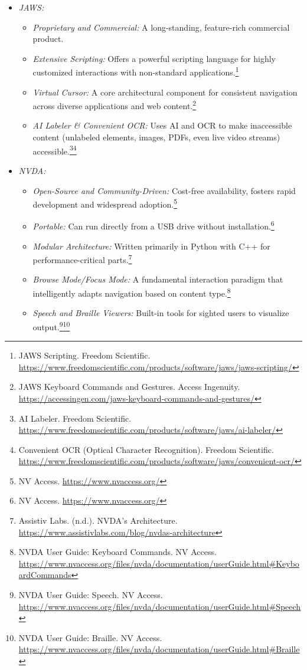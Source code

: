 \begin{itemize}
    \item \emph{JAWS:}
    \begin{itemize}
        \item \emph{Proprietary and Commercial:} A long-standing, feature-rich commercial product.
        \item \emph{Extensive Scripting:} Offers a powerful scripting language for highly customized interactions with non-standard applications.\footnote{JAWS Scripting. Freedom Scientific. \url{https://www.freedomscientific.com/products/software/jaws/jaws-scripting/}}
        \item \emph{Virtual Cursor:} A core architectural component for consistent navigation across diverse applications and web content.\footnote{JAWS Keyboard Commands and Gestures. Access Ingenuity. \url{https://accessingen.com/jaws-keyboard-commands-and-gestures/}}
        \item \emph{AI Labeler \& Convenient OCR:} Uses AI and OCR to make inaccessible content (unlabeled elements, images, PDFs, even live video streams) accessible.\footnote{AI Labeler. Freedom Scientific. \url{https://www.freedomscientific.com/products/software/jaws/ai-labeler/}}\footnote{Convenient OCR (Optical Character Recognition). Freedom Scientific. \url{https://www.freedomscientific.com/products/software/jaws/convenient-ocr/}}
    \end{itemize}
    \item \emph{NVDA:}
    \begin{itemize}
        \item \emph{Open-Source and Community-Driven:} Cost-free availability, fosters rapid development and widespread adoption.\footnote{NV Access. \url{https://www.nvaccess.org/}}
        \item \emph{Portable:} Can run directly from a USB drive without installation.\footnote{NV Access. \url{https://www.nvaccess.org/}}
        \item \emph{Modular Architecture:} Written primarily in Python with C++ for performance-critical parts.\footnote{Assistiv Labs. (n.d.). NVDA's Architecture. \url{https://www.assistivlabs.com/blog/nvdas-architecture}}
        \item \emph{Browse Mode/Focus Mode:} A fundamental interaction paradigm that intelligently adapts navigation based on content type.\footnote{NVDA User Guide: Keyboard Commands. NV Access. \url{https://www.nvaccess.org/files/nvda/documentation/userGuide.html\#KeyboardCommands}}
        \item \emph{Speech and Braille Viewers:} Built-in tools for sighted users to visualize output.\footnote{NVDA User Guide: Speech. NV Access. \url{https://www.nvaccess.org/files/nvda/documentation/userGuide.html\#Speech}}\footnote{NVDA User Guide: Braille. NV Access. \url{https://www.nvaccess.org/files/nvda/documentation/userGuide.html\#Braille}}

\end{itemize}
\end{itemize}
